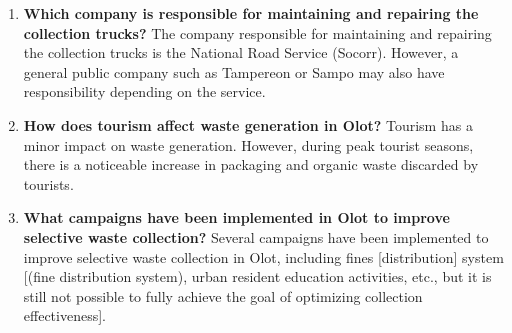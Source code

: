 \begin{enumerate}
Street cleaning is carried out using a manual trowel [cleaning] mechanism [multiple times. However, recently drones and AI technology have also been used for inspection].
\item \textbf{Which company is responsible for maintaining and repairing the collection trucks?}
The company responsible for maintaining and repairing the collection trucks is the National Road Service (Socorr). However, a general public company such as Tampereon or Sampo may also have responsibility depending on the service.
\item \textbf{How does tourism affect waste generation in Olot?}
Tourism has a minor impact on waste generation. However, during peak tourist seasons, there is a noticeable increase in packaging and organic waste discarded by tourists.
\item \textbf{What campaigns have been implemented in Olot to improve selective waste collection?}
Several campaigns have been implemented to improve selective waste collection in Olot, including fines [distribution] system [(fine distribution system), urban resident education activities, etc., but it is still not possible to fully achieve the goal of optimizing collection effectiveness].
\end{enumerate}